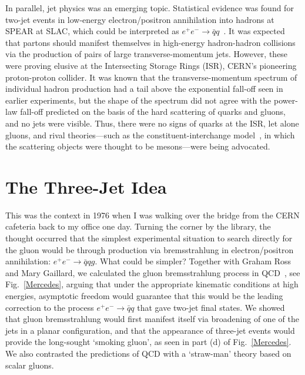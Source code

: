 \documentclass[12pt]{article} %
\begin{document}
In parallel, jet physics was an emerging topic. Statistical evidence was found for two-jet events in low-energy
electron/positron annihilation into hadrons at SPEAR at SLAC, which could be interpreted as $e^+ e^- \to {\bar q} q$~\cite{Hanson}.
It was expected that partons should manifest themselves in high-energy hadron-hadron collisions via the
production of pairs of large transverse-momentum jets. However, these were proving elusive at the
Intersecting Storage Rings (ISR), CERN's pioneering proton-proton collider.
It was known that the transverse-momentum spectrum of individual hadron production had a tail above the
exponential fall-off seen in earlier experiments, but the shape of the spectrum did not agree with the
power-law fall-off predicted on the basis of the hard scattering of quarks and gluons,
and no jets were visible. Thus, there were no signs of quarks at the ISR, let alone gluons,
and rival theories---such as the constituent-interchange model~\cite{CIM}, in which the scattering objects were
thought to be mesons---were being advocated.

\section{The Three-Jet Idea}

This was the context in 1976 when I was walking over the bridge from the CERN cafeteria
back to my office one day. Turning the corner by the library, the thought occurred that the 
simplest experimental situation to search directly for the gluon would be through production via 
bremsstrahlung in electron/positron annihilation: $e^+ e^- \to {\bar q} q g$. What could be simpler?
Together with Graham Ross and Mary Gaillard, we calculated the gluon bremsstrahlung process in QCD~\cite{EGR}, 
see Fig.~\ref{Mercedes}, arguing that under the appropriate kinematic conditions at high energies, asymptotic freedom
would guarantee that this would be the leading correction to the process $e^+ e^- \to {\bar q}q$ that
gave two-jet final states. We showed that gluon bremsstrahlung would first manifest itself via broadening
of one of the jets in a planar configuration, and that the appearance of three-jet events would
provide the long-sought `smoking gluon', as seen in part (d) of Fig.~\ref{Mercedes}.
We also contrasted the predictions of QCD with a `straw-man'
theory based on scalar gluons.
\end{document}
